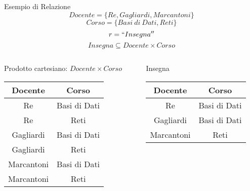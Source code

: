     \begin{frame}{Esempio di Relazione}
        \vspace{-.7cm}
        \[ Docente = \{Re, Gagliardi, Marcantoni\} \]
        \[ Corso = \{Basi~di~Dati, Reti\} \]
        \[ r = ``Insegna'' \]
        \[ Insegna \subseteq Docente \times Corso \]
        \pause
        \begin{columns}
            \begin{column}{0.48\textwidth}
                \centering
                {\small Prodotto cartesiano: $Docente \times Corso$}
        \begin{tabular}{|c|c|}
            \hline
            \rowcolor{cyan!30}Docente & Corso \\
            \hline
            Re & Basi di Dati \\ \hline
            Re & Reti \\ \hline
            Gagliardi & Basi di Dati \\ \hline
            Gagliardi & Reti \\ \hline
            Marcantoni & Basi di Dati \\ \hline
            Marcantoni & Reti \\ \hline
            \end{tabular}
            \end{column}
            \begin{column}{0.48\textwidth}
                \centering
                \pause
                {\small Insegna}
                \newline
                \begin{tabular}{|c|c|}
                    \hline
                    \rowcolor{cyan!30}Docente & Corso \\
                    \hline
                    Re & Basi di Dati \\ \hline
                    Gagliardi & Basi di Dati \\ \hline
                    Marcantoni & Reti \\ \hline
                    \end{tabular}
            \end{column}
        \end{columns}
    \end{frame}